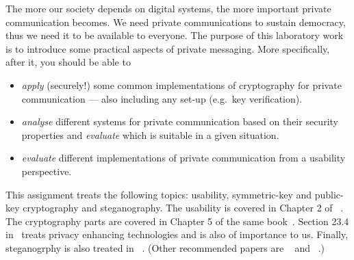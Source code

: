 The more our society depends on digital systems, the more important private 
communication becomes.
We need private communications to sustain democracy, thus we need it to be 
available to everyone.
The purpose of this laboratory work is to introduce some practical aspects of 
private messaging.
More specifically, after it, you should be able to
\begin{itemize}
  \item \emph{apply} (securely!) some common implementations of cryptography 
    for private communication --- also including any set-up (e.g.\ key 
    verification).
  \item \emph{analyse} different systems for private communication based on 
    their security properties and \emph{evaluate} which is suitable in a given 
    situation.
  \item \emph{evaluate} different implementations of private communication from 
    a usability perspective.
\end{itemize}

This assignment treats the following topics: usability, symmetric-key and 
public-key cryptography and steganography.
The usability is covered in Chapter 2 of 
~\cite{Anderson2008sea}.
The cryptography parts are covered in Chapter 5 of the same 
book~\cite{Anderson2008sea}.
Section 23.4 in~\cite{Anderson2008sea} treats privacy enhancing technologies 
and is also of importance to us.
Finally, steganogrphy is also treated in 
~\cite{johnson1998exploring}.
(Other recommended papers are 
~\cite{anderson1998limits} and 
~\cite{provos2003hide}.)
